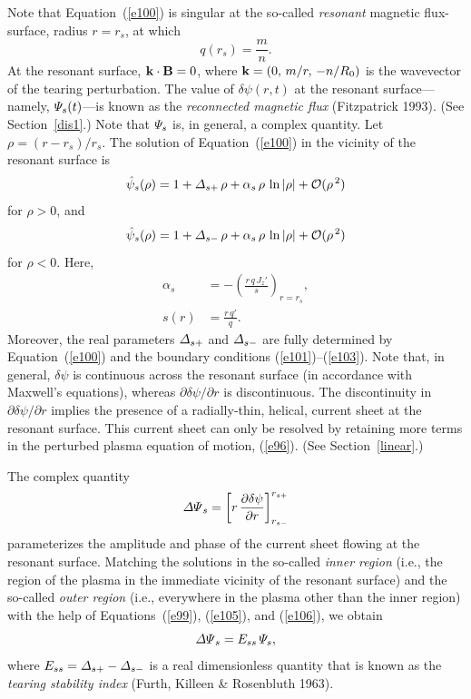 \documentclass[notitlepage,12pt]{article}
\begin{document}
Note that Equation~(\ref{e100}) is singular at the so-called {\em resonant}\/ magnetic flux-surface, radius $r=r_s$, at which 
\begin{equation}\label{e104}
q(r_s)= \frac{m}{n}.
\end{equation}
At the resonant surface, ${\bf k}\cdot{\bf B}=0$, where ${\bf k} = (0,\,m/r,\,-n/R_0)$ is the wavevector of the tearing perturbation. 
The value of $\delta\psi(r,t)$ at the resonant surface---namely, ${\mit\Psi}_s(t)$---is known as the {\em reconnected magnetic flux}\/ (Fitzpatrick 1993). (See Section~\ref{dis1}.)
Note that ${\mit\Psi}_s$ is, in general, a complex quantity. 
Let $\rho=(r-r_s)/r_s$. 
The solution of Equation~(\ref{e100}) in the vicinity of the resonant surface is
\begin{equation}\label{e105}
\hat{\psi}_s(\rho) = 1 + {\mit\Delta}_{s+}\,\rho + \alpha_s\,\rho\,\ln|\rho| + {\cal O}(\rho^{\,2})
\end{equation}
for $\rho>0$, and
\begin{equation}\label{e106}
\hat{\psi}_s(\rho) = 1 + {\mit\Delta}_{s-}\,\rho + \alpha_s\,\rho\,\ln|\rho| + {\cal O}(\rho^{\,2})
\end{equation}
for $\rho<0$. Here, 
\begin{align}\label{e108}
\alpha_s& =- \left(\frac{r\,q\,J_z'}{s}\right)_{r=r_s},\\[0.5ex]
s(r) &= \frac{r\,q'}{q}.\label{shear}
\end{align}
Moreover,  the real parameters ${\mit\Delta}_{s+}$ and  ${\mit\Delta}_{s-}$ are fully determined by Equation~(\ref{e100})
and the boundary conditions (\ref{e101})--(\ref{e103}). Note that, in general, $\delta\psi$ is continuous across the resonant surface (in accordance with Maxwell's equations),
whereas $\partial\delta\psi/\partial r$ is discontinuous. The discontinuity in $\partial \delta\psi/\partial r$ implies the presence of a radially-thin, helical,  current sheet  at the resonant surface. This current sheet can only be resolved by retaining more terms in the perturbed plasma equation of motion, (\ref{e96}). (See Section~\ref{linear}.) 

The complex quantity
\begin{equation}\label{e109}
{\mit\Delta\Psi}_s = \left[r\,\frac{\partial \delta\psi}{\partial r}\right]_{r_{s-}}^{r_{s+}}
\end{equation}
parameterizes the amplitude and phase of the current sheet flowing at the resonant surface. Matching the solutions
in the so-called {\em inner region}\/ (i.e., the region of the plasma in the immediate vicinity of the resonant surface)
and the so-called {\em outer region}\/ (i.e., everywhere in the plasma other than the inner region) with the help
of Equations~(\ref{e99}), (\ref{e105}), and (\ref{e106}), we obtain
\begin{equation}\label{e110}
{\mit\Delta\Psi}_s = E_{ss}\,{\mit\Psi}_s,
\end{equation}
where $E_{ss}= {\mit\Delta}_{s+}-{\mit\Delta}_{s-}$ is a real dimensionless quantity that is known as the {\em tearing stability index}\/ (Furth, Killeen \& Rosenbluth 1963). 
\end{document}
